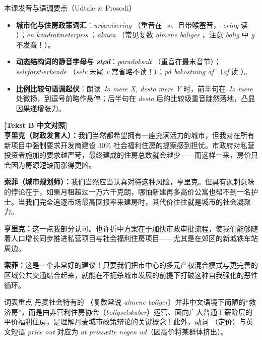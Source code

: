 \begin{tipbox}{本课发音与语调要点（Udtale \& Prosodi）}
\begin{itemize}
  \item \textbf{城市化与住房政策词汇}：\textit{urbanisering} （重音在 \textit{-se-} 且带喉塞音，\textit{-ering} 读 ）；\textit{en kvadratmeterpris} ；\textit{almen} （常见复数 \textit{almene boliger} ，注意 \textit{bolig} 中 \textit{g} 不发音！）。
  \item \textbf{动态结构词的静音字母与 \textit{stød}}：\textit{paradoksalt} （重音在最末音节）；\textit{selvforstærkende} （\textit{selv} 末尾 \textit{v} 常省略不读！）；\textit{på bekostning af} （\textit{af} 读 ）。
  \item \textbf{比例比较句语调起伏}：朗读 \textit{Jo mere X, desto mere Y} 时，前半句在 \textit{Jo mere} 处微扬，到逗号前略作悬停；后半句在 \textit{desto} 后的比较级重音陡然落地，凸显因果递增张力。
\end{itemize}
\end{tipbox}

\begin{transbox}
\small
\textbf{\color{NCDTeal}[Tekst B 中文对照]}\\
\textbf{亨里克（财政发言人）：}我们当然都希望拥有一座充满活力的城市，但我对在所有新项目中强制要求开发商建设 30\% 社会福利住房的提案感到担忧。市政府对私营投资者施加的要求越严苛，最终建成的住房总数就会越少——而这样一来，房价只会因为房源短缺而涨得更凶。

\textbf{索菲（城市规划师）：}我们当然应当认真对待这种风险，亨里克。但具有讽刺意味的悖论在于，如果月租超过一万六千克朗，哪怕新建再多高价公寓也帮不到一名护士。当我们完全追逐市场最高回报率来建房时，其代价往往就是城市的社会凝聚力。

\textbf{亨里克：}这一点我部分认可。也许折中方案在于加快市政审批流程，使我们能够随着人口增长同步推进私营项目与社会福利住房项目——尤其是在郊区的新城铁车站周边。

\textbf{索菲：}这是一个非常好的建议！只要我们把市中心的多元产权混合模式与更完善的区域公共交通结合起来，就能在不扼杀城市发展的前提下打破这种自我强化的恶性循环。
\end{transbox}


\begin{tipbox}{词表重点}
丹麦社会特有的 （复数常说 \textit{almene boliger}）并非中文语境下简陋的“救济房”，而是由非营利住房协会（\textit{boligselskaber}）运营、面向广大普通工薪阶层的平价福利住房，是理解丹麦城市政策辩论的关键概念！此外，动词 （定价）与英文短语 \textit{price out} 对应为 \textit{at prissætte nogen ud}（因高价将某群体挤出）。
\end{tipbox}

